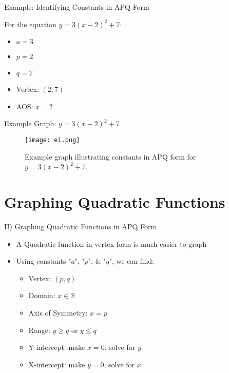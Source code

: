 \documentclass[aspectratio=169]{beamer}
\begin{document}
\begin{frame}{Example: Identifying Constants in APQ Form}
    \begin{tcolorbox}[colback=lightgray,colframe=primary,title=Example]
        \footnotesize
        For the equation $y = 3(x-2)^2 + 7$:
        \begin{itemize}
            \item $a = 3$
            \item $p = 2$
            \item $q = 7$
            \item Vertex: $(2,7)$
            \item AOS: $x = 2$
        \end{itemize}
    \end{tcolorbox}
\end{frame}

\begin{frame}{Example Graph: $y = 3(x-2)^2 + 7$}
    \begin{figure}[H]
        \centering
        \texttt{[image: e1.png]}
        \caption{Example graph illustrating constants in APQ form for $y = 3(x-2)^2 + 7$.}
    \end{figure}
\end{frame}

\section{Graphing Quadratic Functions}

\begin{frame}{II) Graphing Quadratic Functions in APQ Form}
    \begin{tcolorbox}[colback=lightgray,colframe=primary,title=Key Points]
        \footnotesize
        \begin{itemize}
            \item A Quadratic function in vertex form is much easier to graph
            \item Using constants "$a$", "$p$", \& "$q$", we can find:
                \begin{itemize}
                    \item Vertex: $(p,q)$
                    \item Domain: $x \in \mathbb{R}$
                    \item Axis of Symmetry: $x = p$
                    \item Range: $y \geq q$ or $y \leq q$
                    \item Y-intercept: make $x=0$, solve for $y$
                    \item X-intercept: make $y=0$, solve for $x$
                \end{itemize}
        \end{itemize}
    \end{tcolorbox}
\end{frame}
\end{document}
